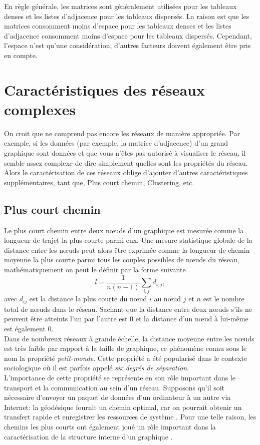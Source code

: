 En règle générale, les matrices sont généralement utilisées pour les tableaux denses et les listes d'adjacence pour les 
tableaux dispersés. La raison est que les matrices consomment moins d'espace pour les tableaux denses et les listes
d'adjacence consomment moins d'espace pour les tableaux dispersés. Cependant, l'espace n'est qu'une considération, d'autres
facteurs doivent également être pris en compte.


\section{Caractéristiques des réseaux complexes}

On croit que ne comprend pas encore les réseaux de manière appropriée. Par exemple, si les données (par exemple, la matrice d'adjacence) d'un grand graphique sont données et que vous n'êtes pas autorisé à visualiser le réseau,
il semble assez complexe de dire simplement quelles sont les propriétés du réseau. Alors
le caractérisation de ces réseaux oblige d'ajouter d'autres caractéristiques supplémentaires, tant que, Plus court chemin,
Clustering, etc.
   \subsection{Plus court chemin}
   
   Le plus court chemin entre deux nœuds d'un graphique est mesurée comme la longueur de trajet la plus courte parmi eux. Une
   mesure statistique globale de la distance entre les nœuds peut alors être exprimée comme la longueur de chemin moyenne la
   plus courte parmi tous les couples possibles de nœuds du réseau, mathématiquement on peut le définir par la forme suivante
   \begin{equation}
    l=\frac{1}{n(n-1)}\sum_{i,j} d_{i,j},
   \end{equation}
   avec $d_{ij}$ est la distance la plus courte du nœud $i$ au nœud $j$ et $n$ est le nombre total de nœuds dans le réseau. Sachant que la distance entre deux nœuds s'ils ne peuvent être atteints l'un par l'autre est $0$  et la distance d'un nœud à lui-même est également $0$.\\
   Dans de nombreux réseaux à grande échelle, la distance moyenne entre les nœuds est très faible par rapport à la taille de graphique, ce phénomène connu sous le nom la propriété \textit{petit-monde}. Cette propriété a été popularisé dans le contexte sociologique où il est parfois appelé \textit{six degrés de séparation}\cite{Mi1967}.\\
   L'importance de cette propriété se représente en son rôle important dans le transport et la communication au sein d'un réseau. Supposons qu'il soit nécessaire d'envoyer un paquet de données d'un ordinateur à un autre via Internet: la géodésique fournit un chemin  optimal, car on pourrait obtenir un transfert rapide et enregistrer les ressources de système \cite{PV2004}. Pour une telle raison, les chemins les plus courts ont également joué un rôle important dans la caractérisation de la structure interne d'un graphique \cite{Wa1994,JS2000,Bo-al2006}.

